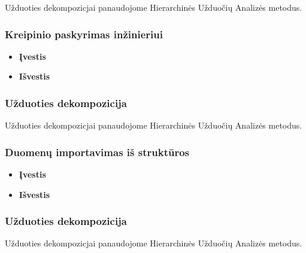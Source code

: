 	Užduoties dekompozicjai panaudojome Hierarchinės Užduočių Analizės metodus.

	\subsubsection {Kreipinio paskyrimas inžinieriui}

		\begin{itemize}
			\item \textbf{Įvestis}
			\item \textbf{Išvestis} 
		\end{itemize}
		
	\subsubsection {Užduoties dekompozicija}

	Užduoties dekompozicjai panaudojome Hierarchinės Užduočių Analizės metodus.

	\subsubsection {Duomenų importavimas iš struktūros}

		\begin{itemize}
			\item \textbf{Įvestis}
			\item \textbf{Išvestis} 
		\end{itemize}
		
	\subsubsection {Užduoties dekompozicija}

	Užduoties dekompozicjai panaudojome Hierarchinės Užduočių Analizės metodus.
